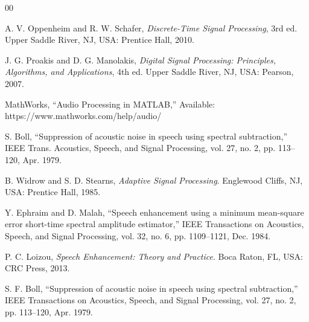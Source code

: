 \documentclass[conference]{IEEEtran}
\begin{document}
\begin{thebibliography}{00}

 A. V. Oppenheim and R. W. Schafer, \textit{Discrete-Time Signal Processing}, 3rd ed. Upper Saddle River, NJ, USA: Prentice Hall, 2010.

 J. G. Proakis and D. G. Manolakis, \textit{Digital Signal Processing: Principles, Algorithms, and Applications}, 4th ed. Upper Saddle River, NJ, USA: Pearson, 2007.

 MathWorks, ``Audio Processing in MATLAB,'' Available: https://www.mathworks.com/help/audio/

 S. Boll, ``Suppression of acoustic noise in speech using spectral subtraction,'' IEEE Trans. Acoustics, Speech, and Signal Processing, vol. 27, no. 2, pp. 113--120, Apr. 1979.

 B. Widrow and S. D. Stearns, \textit{Adaptive Signal Processing}. Englewood Cliffs, NJ, USA: Prentice Hall, 1985.

Y. Ephraim and D. Malah, “Speech enhancement using a minimum mean-square error short-time spectral amplitude estimator,” IEEE Transactions on Acoustics, Speech, and Signal Processing, vol. 32, no. 6, pp. 1109–1121, Dec. 1984.

P. C. Loizou, \textit{Speech Enhancement: Theory and Practice}. Boca Raton, FL, USA: CRC Press, 2013.

S. F. Boll, “Suppression of acoustic noise in speech using spectral subtraction,” IEEE Transactions on Acoustics, Speech, and Signal Processing, vol. 27, no. 2, pp. 113–120, Apr. 1979.

\end{thebibliography}
\end{document}
